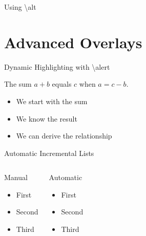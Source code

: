 \documentclass{beamer}
\begin{document}
\begin{frame}{Using \textbackslash alt}
    \begin{center}
        \Large
    \end{center}
    
    \vspace{1cm}
    
\end{frame}

\section{Advanced Overlays}

\begin{frame}{Dynamic Highlighting with \textbackslash alert}
    \begin{theorem}
        The sum \alert<2>{$a + b$} equals \alert<3>{$c$} when 
        \alert<4>{$a = c - b$}.
    \end{theorem}
    
    \begin{itemize}
        \item<2-> We start with the sum
        \item<3-> We know the result
        \item<4-> We can derive the relationship
    \end{itemize}
\end{frame}

\begin{frame}{Automatic Incremental Lists}
    \begin{columns}
        \begin{block}{Manual}
            \begin{itemize}
                \item<1-> First
                \item<2-> Second
                \item<3-> Third
            \end{itemize}
        \end{block}
        
        \begin{block}{Automatic}
            \begin{itemize}[<+->]
                \item First
                \item Second
                \item Third
            \end{itemize}
        \end{block}
    \end{columns}
\end{frame}
\end{document}
